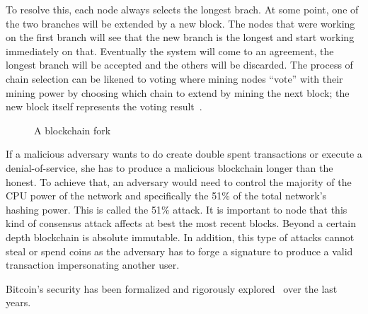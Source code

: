 To resolve this, each node always selects the longest brach. At some point, one of the two branches will be extended by a new block. The nodes that were working on the first branch will see that the new branch is the longest and start working immediately on that. Eventually the system will come to an agreement, the longest branch will be accepted and the others will be discarded. The process of chain selection can be likened to voting where mining nodes ``vote'' with their mining power by choosing which chain to extend by mining the next block; the new block itself represents the voting result~\cite{antonopoulos2014mastering}.

\begin{figure}[!ht]
  \centering
  \caption{A blockchain fork}
  \label{fig:bl:fork}
\end{figure}

If a malicious adversary wants to do create double spent transactions or execute a denial-of-service, she has to produce a malicious blockchain longer than the honest. To achieve that, an adversary would need to control the majority of the CPU power of the network and specifically the 51\% of the total network’s hashing power. This is called the 51\% attack. It is important to node that this kind of consensus attack affects at best the most recent blocks. Beyond a certain depth blockchain is absolute immutable. In addition, this type of attacks cannot steal or spend coins as the adversary has to forge a signature to produce a valid transaction impersonating another user.

 Bitcoin's security has been formalized and rigorously explored~\cite{10.1007/978-3-662-46803-6_10} over the last years.

